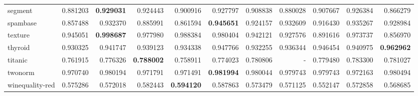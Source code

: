 \begin{tabular}{lrrrrrrrrrr}
segment         &   0.881203 &  \textbf{0.929031} &  0.924443 &  0.900916 &  0.927797 &  0.908838 &  0.880028 &  0.907667 &  0.926384 &  0.866279 \\
spambase        &   0.857488 &  0.932370 &  0.885991 &  0.861594 &  \textbf{0.945651} &  0.924157 &  0.932609 &  0.916430 &  0.935267 &  0.928984 \\
texture         &   0.945051 &  \textbf{0.998687} &  0.977980 &  0.988384 &  0.980404 &  0.942121 &  0.927576 &  0.891616 &  0.973737 &  0.856970 \\
thyroid         &   0.930325 &  0.941747 &  0.939123 &  0.934338 &  0.947766 &  0.932255 &  0.936344 &  0.946454 &  0.940975 &  \textbf{0.962962} \\
titanic         &   0.761915 &  0.776326 &  \textbf{0.788002} &  0.758911 &  0.774023 &  0.780806 &       - &  0.779480 &  0.783300 &  0.781027 \\
twonorm         &   0.970740 &  0.980194 &  0.971791 &  0.971491 &  \textbf{0.981994} &  0.980044 &  0.979743 &  0.979743 &  0.972163 &  0.980494 \\
winequality-red &   0.575286 &  0.572018 &  0.582443 &  \textbf{0.594120} &  0.587863 &  0.573479 &  0.571125 &  0.552147 &  0.572858 &  0.568685 \\
\bottomrule
\end{tabular}
